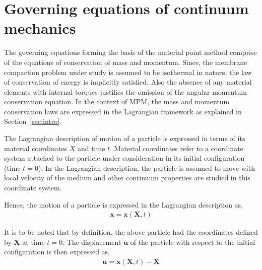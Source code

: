 \section{Governing equations of continuum mechanics}

The governing equations forming the basis of the material point method comprise of the equations of conservation of mass and momentum. Since, the membrane compaction problem under study is assumed to be isothermal in nature, the law of conservation of energy is implicitly satisfied. Also the absence of any material elements with internal torques justifies the omission of the angular momentum conservation equation. In the context of MPM, the mass and momentum conservation laws are expressed in the Lagrangian framework as explained in Section~\ref{sec:intro}.

The Lagrangian description of motion of a particle is expressed in terms of its material coordinates $X$ and time $t$. Material coordinates refer to a coordinate system attached to the particle under consideration in its initial configuration (time $t=0$). In the Lagrangian description, the particle is assumed to move with local velocity of the medium and other continuum properties are studied in this coordinate system. 

Hence, the motion of a particle is expressed in the Lagrangian description as,
\begin{align}
	\mathbf{x} = \mathbf{x}(\mathbf{X},t)
\end{align}

It is to be noted that by definition, the above particle had the coordinates defined by $\mathbf{X}$ at time $t=0$. The displacement $\mathbf{u}$ of the particle with respect to the initial configuration is then expressed as, 
\begin{align}
	\mathbf{u} = \mathbf{x}(\mathbf{X},t)-\mathbf{X}
\end{align}

